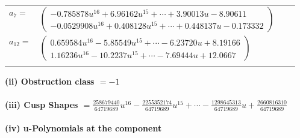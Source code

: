 \documentclass[1p]{elsarticle_modified}
\theoremstyle{definition}
\begin{document}
\begin{tabular}{m{7pt} m{180pt} m{7pt} m{180pt} }
\flushright $a_{7}=$&$\begin{pmatrix}-0.785878 u^{16}+6.96162 u^{15}+\cdots+3.90013 u-8.90611\\-0.0529908 u^{16}+0.408128 u^{15}+\cdots+0.448137 u-0.173332\end{pmatrix}$ \\
\flushright $a_{12}=$&$\begin{pmatrix}0.659584 u^{16}-5.85549 u^{15}+\cdots-6.23720 u+8.19166\\1.16236 u^{16}-10.2237 u^{15}+\cdots-7.69444 u+12.0667\end{pmatrix}$\\&\end{tabular}
\flushleft \textbf{(ii) Obstruction class $= -1$}\\~\\
\flushleft \textbf{(iii) Cusp Shapes $= \frac{258679440}{64719689} u^{16}-\frac{2255352174}{64719689} u^{15}+\cdots-\frac{1298645313}{64719689} u+\frac{2660816310}{64719689}$}\\~\\
\newpage\renewcommand{\arraystretch}{1}
\flushleft \textbf{(iv) u-Polynomials at the component}\newline \\
\end{document}
